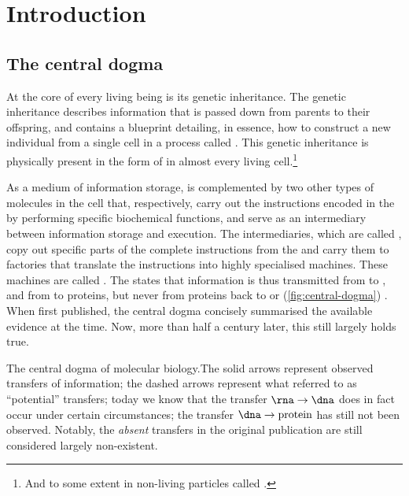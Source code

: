 \chapter{Introduction}


\section{The central dogma}

At the core of every living being is its genetic inheritance. The genetic
inheritance describes information that is passed down from parents to their
offspring, and contains a blueprint detailing, in essence, how to construct a
new individual from a single cell in a process called .
This genetic inheritance is physically present in the form of \dna in almost
every living cell.\footnote{And to some extent in non-living particles called
.}

As a medium of information storage, \dna is complemented by two other types of
molecules in the cell that, respectively, carry out the instructions encoded in
the \dna by performing specific biochemical functions, and serve as an
intermediary between information storage and execution. The intermediaries,
which are called , copy out specific parts of the complete
instructions from the \dna and carry them to factories that translate the
instructions into highly specialised machines. These machines are called
. The  states that
information is thus transmitted from \dna to \rna, and from \rna to proteins,
but never from proteins back to \rna or \dna (\cref{fig:central-dogma})
\citep{Crick:1958,Crick:1970}. When first published, the central dogma concisely
summarised the available evidence at the time. Now, more than half a century
later, this still largely holds true.

    {The central dogma of molecular biology.}{The solid arrows represent
    observed transfers of information; the dashed arrows represent what
    \citet{Crick:1970} referred to as “potential” transfers; today we know that
    the transfer \(\text{\rna}\rightarrow\text{\dna}\) does in fact occur under
    certain circumstances; the transfer \(\text{\dna}\rightarrow\text{protein}\)
    has still not been observed. Notably, the \emph{absent} transfers in the
    original publication are still considered largely non-existent.}

